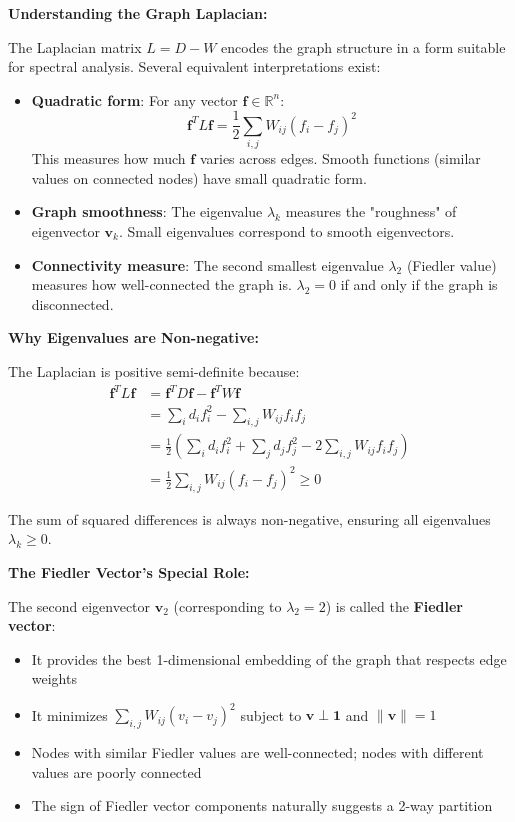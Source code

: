 \documentclass[12pt]{article}
\begin{document}
\begin{explanation}

\textbf{Understanding the Graph Laplacian:}

The Laplacian matrix $L = D - W$ encodes the graph structure in a form suitable for spectral analysis. Several equivalent interpretations exist:

\begin{itemize}
    \item \textbf{Quadratic form}: For any vector $\mathbf{f} \in \mathbb{R}^n$:
    \[
    \mathbf{f}^T L \mathbf{f} = \frac{1}{2}\sum_{i,j} W_{ij}(f_i - f_j)^2
    \]
    This measures how much $\mathbf{f}$ varies across edges. Smooth functions (similar values on connected nodes) have small quadratic form.

    \item \textbf{Graph smoothness}: The eigenvalue $\lambda_k$ measures the "roughness" of eigenvector $\mathbf{v}_k$. Small eigenvalues correspond to smooth eigenvectors.

    \item \textbf{Connectivity measure}: The second smallest eigenvalue $\lambda_2$ (Fiedler value) measures how well-connected the graph is. $\lambda_2 = 0$ if and only if the graph is disconnected.
\end{itemize}

\textbf{Why Eigenvalues are Non-negative:}

The Laplacian is positive semi-definite because:
\begin{align*}
\mathbf{f}^T L \mathbf{f} &= \mathbf{f}^T D \mathbf{f} - \mathbf{f}^T W \mathbf{f} \\
&= \sum_i d_i f_i^2 - \sum_{i,j} W_{ij} f_i f_j \\
&= \frac{1}{2}\left(\sum_i d_i f_i^2 + \sum_j d_j f_j^2 - 2\sum_{i,j} W_{ij} f_i f_j\right) \\
&= \frac{1}{2}\sum_{i,j} W_{ij}(f_i - f_j)^2 \geq 0
\end{align*}

The sum of squared differences is always non-negative, ensuring all eigenvalues $\lambda_k \geq 0$.

\textbf{The Fiedler Vector's Special Role:}

The second eigenvector $\mathbf{v}_2$ (corresponding to $\lambda_2 = 2$) is called the \textbf{Fiedler vector}:

\begin{itemize}
    \item It provides the best 1-dimensional embedding of the graph that respects edge weights
    \item It minimizes $\sum_{i,j} W_{ij}(v_i - v_j)^2$ subject to $\mathbf{v} \perp \mathbf{1}$ and $\|\mathbf{v}\| = 1$
    \item Nodes with similar Fiedler values are well-connected; nodes with different values are poorly connected
    \item The sign of Fiedler vector components naturally suggests a 2-way partition
\end{itemize}


\end{explanation}
\end{document}

